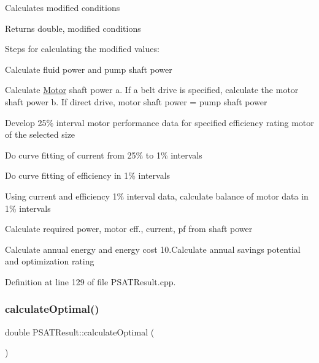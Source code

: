 Calculates modified conditions \begin{DoxyReturn}{Returns}
double, modified conditions 
\end{DoxyReturn}
Steps for calculating the modified values\+:
\begin{DoxyEnumerate}
\item Calculate fluid power and pump shaft power
\item Calculate \hyperlink{class_motor}{Motor} shaft power a. If a belt drive is specified, calculate the motor shaft power b. If direct drive, motor shaft power = pump shaft power
\item Develop 25\% interval motor performance data for specified efficiency rating motor of the selected size
\item Do curve fitting of current from 25\% to 1\% intervals
\item Do curve fitting of efficiency in 1\% intervals
\item Using current and efficiency 1\% interval data, calculate balance of motor data in 1\% intervals
\item Calculate required power, motor eff., current, pf from shaft power
\item Calculate annual energy and energy cost 10.\+Calculate annual savings potential and optimization rating
\end{DoxyEnumerate}

Definition at line 129 of file P\+S\+A\+T\+Result.\+cpp.

\mbox{\label{class_p_s_a_t_result_a25d50cd89b326f18449496a56d54f472}} 
\subsubsection{\texorpdfstring{calculate\+Optimal()}{calculateOptimal()}}
{\footnotesize\ttfamily double P\+S\+A\+T\+Result\+::calculate\+Optimal (\begin{DoxyParamCaption}{ }\end{DoxyParamCaption})}

